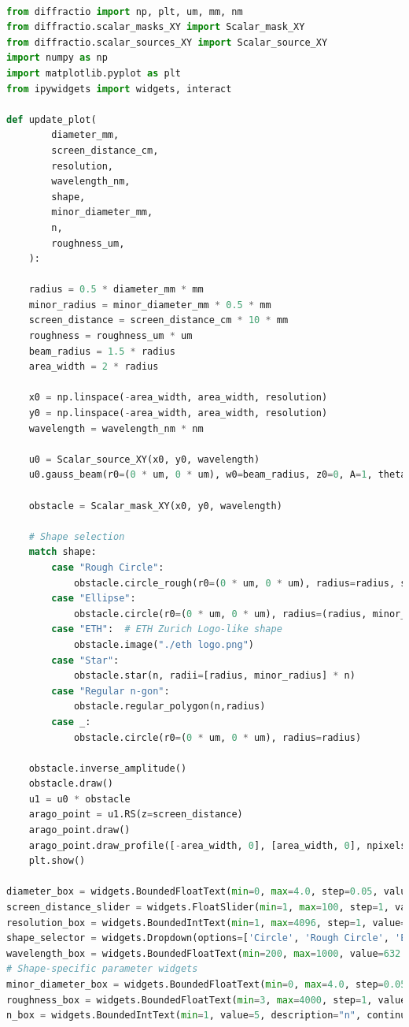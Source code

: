 \documentclass[11pt,a4paper]{article}
\begin{document}
\begin{lstlisting}[language=Python]

from diffractio import np, plt, um, mm, nm
from diffractio.scalar_masks_XY import Scalar_mask_XY
from diffractio.scalar_sources_XY import Scalar_source_XY
import numpy as np
import matplotlib.pyplot as plt
from ipywidgets import widgets, interact

def update_plot(
        diameter_mm, 
        screen_distance_cm, 
        resolution,
        wavelength_nm,
        shape,
        minor_diameter_mm, 
        n, 
        roughness_um,
    ):

    radius = 0.5 * diameter_mm * mm
    minor_radius = minor_diameter_mm * 0.5 * mm
    screen_distance = screen_distance_cm * 10 * mm
    roughness = roughness_um * um
    beam_radius = 1.5 * radius
    area_width = 2 * radius

    x0 = np.linspace(-area_width, area_width, resolution)
    y0 = np.linspace(-area_width, area_width, resolution)
    wavelength = wavelength_nm * nm

    u0 = Scalar_source_XY(x0, y0, wavelength)
    u0.gauss_beam(r0=(0 * um, 0 * um), w0=beam_radius, z0=0, A=1, theta=0.0)

    obstacle = Scalar_mask_XY(x0, y0, wavelength)

    # Shape selection
    match shape:
        case "Rough Circle":
            obstacle.circle_rough(r0=(0 * um, 0 * um), radius=radius, sigma=roughness, angle=0)
        case "Ellipse":
            obstacle.circle(r0=(0 * um, 0 * um), radius=(radius, minor_radius))
        case "ETH":  # ETH Zurich Logo-like shape
            obstacle.image("./eth logo.png")
        case "Star":
            obstacle.star(n, radii=[radius, minor_radius] * n)
        case "Regular n-gon":
            obstacle.regular_polygon(n,radius)
        case _:
            obstacle.circle(r0=(0 * um, 0 * um), radius=radius)

    obstacle.inverse_amplitude()
    obstacle.draw()
    u1 = u0 * obstacle
    arago_point = u1.RS(z=screen_distance)
    arago_point.draw()
    arago_point.draw_profile([-area_width, 0], [area_width, 0], npixels=resolution, order=3)
    plt.show()

diameter_box = widgets.BoundedFloatText(min=0, max=4.0, step=0.05, value=1.0, description='Diameter [mm]', continuous_update=False)
screen_distance_slider = widgets.FloatSlider(min=1, max=100, step=1, value=50, description='Screen Distance [cm]', continuous_update=False)
resolution_box = widgets.BoundedIntText(min=1, max=4096, step=1, value=128, description='Resolution', continuous_update=False)
shape_selector = widgets.Dropdown(options=['Circle', 'Rough Circle', 'Ellipse', 'Star', 'Regular n-gon', 'ETH'], description="Shape")
wavelength_box = widgets.BoundedFloatText(min=200, max=1000, value=632.8, description="Wavelength [nm]")
# Shape-specific parameter widgets
minor_diameter_box = widgets.BoundedFloatText(min=0, max=4.0, step=0.05, value=0.8, description="Minor Diameter [mm]", continuous_update=False)
roughness_box = widgets.BoundedFloatText(min=3, max=4000, step=1, value=5, description="Roughness [µm]", continuous_update=False)
n_box = widgets.BoundedIntText(min=1, value=5, description="n", continuous_update=False)



\end{lstlisting}
\end{document}
